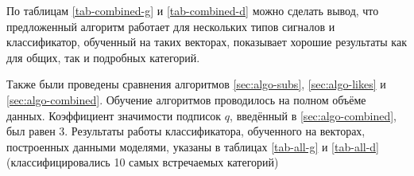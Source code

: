 \documentclass[times,specification,annotation]{itmo-student-thesis}
\begin{document}

По таблицам \ref{tab-combined-g} и \ref{tab-combined-d} можно сделать вывод, что предложенный алгоритм работает для нескольких типов сигналов и классификатор, обученный на таких векторах, показывает хорошие результаты как для общих, так и подробных категорий.

Также были проведены сравнения алгоритмов \ref{sec:algo-subs},  \ref{sec:algo-likes} и  \ref{sec:algo-combined}. Обучение алгоритмов проводилось на полном объёме данных. Коэффициент значимости подписок $q$, введённый в \ref{sec:algo-combined}, был равен 3. Результаты работы классификатора, обученного на векторах, построенных данными моделями, указаны в таблицах \ref{tab-all-g} и  \ref{tab-all-d} (классифицировались 10 самых встречаемых категорий)
\end{document}
